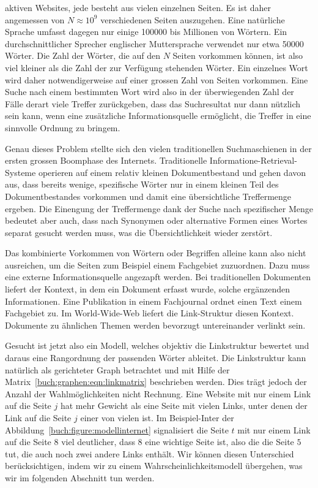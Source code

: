 aktiven Websites, jede besteht aus vielen einzelnen Seiten.
Es ist daher angemessen von $N\approx 10^9$ verschiedenen Seiten auszugehen.
Eine natürliche Sprache umfasst dagegen nur einige 100000 bis Millionen
von Wörtern.
Ein durchschnittlicher Sprecher englischer Muttersprache verwendet nur etwa
50000 Wörter.
Die Zahl der Wörter, die auf den $N$ Seiten vorkommen können, ist also
viel kleiner als die Zahl der zur Verfügung stehenden Wörter.
Ein einzelnes Wort wird daher notwendigerweise auf einer grossen Zahl
von Seiten vorkommen.
Eine Suche nach einem bestimmten Wort wird also in der überwiegenden Zahl
der Fälle derart viele Treffer zurückgeben, dass das Suchresultat
nur dann nützlich sein kann, wenn eine zusätzliche Informationsquelle
ermöglicht, die Treffer in eine sinnvolle Ordnung zu bringem.

Genau dieses Problem stellte sich den vielen traditionellen Suchmaschienen
in der ersten grossen Boomphase des Internets.
Traditionelle Informatione-Retrieval-Systeme operieren auf einem relativ
kleinen Dokumentbestand und gehen davon aus, dass bereits wenige, spezifische
Wörter nur in einem kleinen Teil des Dokumentbestandes vorkommen und damit
eine übersichtliche Treffermenge ergeben.
Die Einengung der Treffermenge dank der Suche nach spezifischer Menge
bedeutet aber auch, dass nach Synonymen oder alternative Formen eines
Wortes separat gesucht werden muss, was die Übersichtlichkeit wieder
zerstört.

Das kombinierte Vorkommen von Wörtern oder Begriffen alleine kann also 
nicht ausreichen, um die Seiten zum Beispiel einem Fachgebiet zuzuordnen.
Dazu muss eine externe Informationsquelle angezapft werden.
Bei traditionellen Dokumenten liefert der Kontext, in dem ein
Dokument erfasst wurde, solche ergänzenden Informationen.
Eine Publikation in einem Fachjournal ordnet einen Text einem Fachgebiet zu.
Im World-Wide-Web liefert die Link-Struktur diesen Kontext.
Dokumente zu ähnlichen Themen werden bevorzugt untereinander verlinkt
sein.

Gesucht ist jetzt also ein Modell, welches objektiv die Linkstruktur
bewertet und daraus eine Rangordnung der passenden Wörter ableitet.
Die Linkstruktur kann natürlich als gerichteter Graph betrachtet und 
mit Hilfe der Matrix~\eqref{buch:graphen:eqn:linkmatrix}
beschrieben werden.
Dies trägt jedoch der Anzahl der Wahlmöglichkeiten nicht Rechnung.
Eine Website mit nur einem Link auf die Seite $j$ hat mehr Gewicht
als eine Seite mit vielen Links, unter denen der Link auf die Seite $j$
einer von vielen ist.
Im Beispiel-Inter der Abbildung~\ref{buch:figure:modellinternet}
signalisiert die Seite $t$ mit nur einem Link auf die Seite $8$
viel deutlicher, dass $8$ eine wichtige Seite ist, also die die
Seite $5$ tut, die auch noch zwei andere Links enthält.
Wir können diesen Unterschied berücksichtigen, indem wir zu einem
Wahrscheinlichkeitsmodell übergehen, was wir im folgenden Abschnitt
tun werden.


